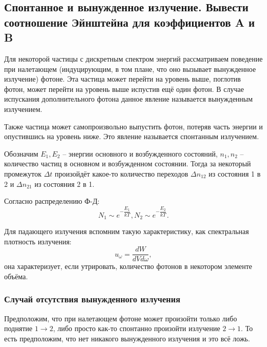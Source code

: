 \subsection{Спонтанное и вынужденное излучение. Вывести соотношение Эйнштейна для
коэффициентов A и B}\label{einstein-a-b}

Для некоторой частицы с дискретным спектром энергий рассматриваем поведение при налетающем
(индуцирующим, в том плане, что оно вызывает вынужденное излучение) фотоне. Эта частица может
перейти на уровень выше, поглотив фотон, может перейти на уровень выше испустив ещё один фотон.
В случае испускания дополнительного фотона данное явление называется вынужденным излучением.

Также частица может самопроизвольно выпустить фотон, потеряв часть энергии и опустившись на
уровень ниже. Это явление называется спонтанным излучением.

Обозначим $E_1, E_2$ -- энергии основного и возбужденного состояний, $n_1, n_2$ -- количество
частиц в основном и возбужденном состоянии. Тогда за некоторый промежуток $\Delta t$ произойдёт
какое-то количество переходов $\Delta n_{12}$ из состояния 1 в 2 и $\Delta n_{21}$ из
состояния 2 в 1.

Согласно распределению Ф-Д:
\[
  N_1 \sim e^{-\dfrac{E_1}{kT}}, N_2 \sim e^{-\dfrac{E_2}{kT}}.
\]

Для падающего излучения вспомним такую характеристику, как спектральная плотность излучения:
\[
  u_\omega = \dfrac{dW}{dV d\omega},
\]
она характеризует, если утрировать, количество фотонов в некотором элементе объёма.

\subsubsection{Случай отсутствия вынужденного излучения}
Предположим, что при налетающем фотоне может произойти только либо поднятие $1 \to 2$, 
либо просто как-то спонтанно произойти излучение $2 \to 1$. То есть предположим, что нет никакого
вынужденного излучения и это всё ложь.

